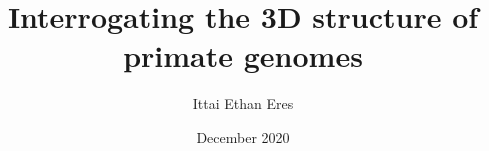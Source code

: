 \documentclass{ucetd}
\title{Interrogating the 3D structure of primate genomes}
\author{Ittai Ethan Eres}
\date{December 2020}
\begin{document}
\maketitle

\makecopyright
\makeepigraph


\tableofcontents
\listoffigures
\listoftables





\mainmatter










\makebibliography

%
%
\end{document}
